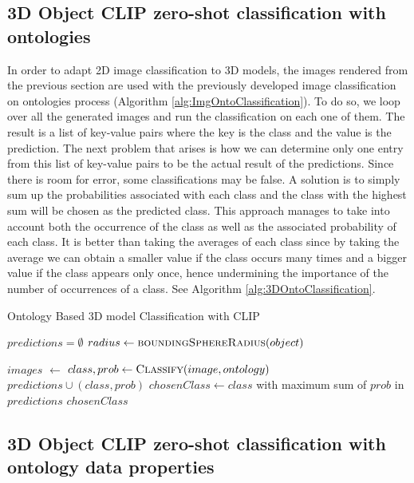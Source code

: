 \documentclass[a4paper,11pt,oneside]{article}
\newlength\mylen
\begin{document}
\subsection{3D Object CLIP zero-shot classification with ontologies}
In order to adapt 2D image classification to 3D models, the images rendered from the previous section are used with the previously developed image classification on ontologies process (Algorithm \ref{alg:ImgOntoClassification}). To do so, we loop over all the generated images and run the classification on each one of them. The result is a list of key-value pairs where the key is the class and the value is the prediction. The next problem that arises is how we can determine only one entry from this list of key-value pairs to be the actual result of the predictions. Since there is room for error, some classifications may be false. A solution is to simply sum up the probabilities associated with each class and the class with the highest sum will be chosen as the predicted class. This approach manages to take into account both the occurrence of the class as well as the associated probability of each class. It is better than taking the averages of each class since by taking the average we can obtain a smaller value if the class occurs many times and a bigger value if the class appears only once, hence undermining the importance of the number of occurrences of a class. See Algorithm \ref{alg:3DOntoClassification}.
\begin{algorithm}[H]
  		\caption{Ontology Based 3D model Classification with CLIP}\label{alg:3DOntoClassification}
  		\begin{algorithmic}
  			\State $predictions = \emptyset$
  			\State $radius \gets \Call{boundingSphereRadius}{object}$
  			
  			\State $images$ $\leftarrow$  
  				\State $class, prob \gets \Call{Classify}{image, ontology}$
  				\State $predictions \cup (class, prob)$
  			\EndFor
  			\State $chosenClass \gets class$ with maximum sum of $prob$ in $predictions$
  			\State \Return $chosenClass$
  			\EndFunction
  		\end{algorithmic}
\end{algorithm}
\subsection{3D Object CLIP zero-shot classification with ontology data properties }
\end{document}
